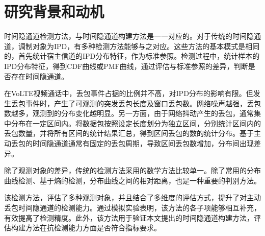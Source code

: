 \section{研究背景和动机}
\label{chap:analyze:motivation}

时间隐通道检测方法，与时间隐通道构建方法是一一对应的。对于传统的时间隐通道，调制对象为IPD，有多种检测方法能够与之对应。这些方法的基本模式是相同的，首先统计宿主信道的IPD分布特征，作为标准参照。检测过程中，统计样本的IPD分布特征，得到CDF曲线或PMF曲线，通过评估与标准参照的差异，判断是否存在时间隐通道。

在VoLTE视频通话中，丢包事件占据的比例并不高，对IPD分布的影响有限。但发生丢包事件时，产生了可观测的突发丢包长度及窗口丢包数。网络噪声越强，丢包数越多，观测到的分布变化越明显。另一方面，由于网络抖动产生的丢包，通常集中分布在一定区间内。将数据包按照设定长度划分为独立区间，分别统计区间内的丢包数量，并将所有区间的统计结果汇总，得到区间丢包的数的统计分布。基于主动丢包的时间隐通道通常有固定的丢包周期，导致区间丢包数增加，分布间出现差异。

除了观测对象的差异，传统的检测方法采用的数学方法比较单一。除了常用的分布曲线检测、基于熵的检测，分布曲线之间的相对距离，也是一种重要的判别方法。

该检测方法，评估了多种观测对象，并且结合了多维度的评估方式，提升了对主动丢包时间隐通道的检测能力。通过模拟实验表明，该方法的各子项能够相互补充，有效提高了检测精度。此外，该方法用于验证本文提出的时间隐通道构建方法，评估构建方法在抗检测能力方面是否符合指标要求。